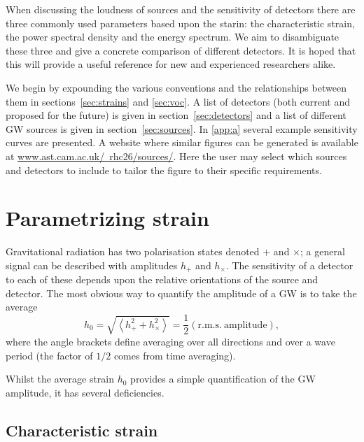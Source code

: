 \documentclass[fleqn,12pt]{iopart}
\begin{document}
When discussing the loudness of sources and the sensitivity of detectors there are three commonly used parameters based upon the starin: the characteristic strain, the power spectral density and the energy spectrum. We aim to disambiguate these three and give a concrete comparison of different detectors. It is hoped that this will provide a useful reference for new and experienced researchers alike.

We begin by expounding the various conventions and the relationships between them in sections~\ref{sec:strains} and \ref{sec:voc}. A list of detectors (both current and proposed for the future) is given in section~\ref{sec:detectors} and a list of different GW sources is given in section~\ref{sec:sources}. In \ref{app:a} several example sensitivity curves are presented. A website where similar figures can be generated is available at \href{http://www.ast.cam.ac.uk/~rhc26/sources/}{www.ast.cam.ac.uk/~rhc26/sources/}. Here the user may select which sources and detectors to include to tailor the figure to their specific requirements.

\section{Parametrizing strain}

Gravitational radiation has two polarisation states denoted $+$ and $\times$; a general signal can be described with amplitudes $h_{+}$ and $h_{\times}$. The sensitivity of a detector to each of these depends upon the relative orientations of the source and detector. The most obvious way to quantify the amplitude of a GW is to take the average
\begin{equation}\label{eq:h0}
h_{0} = \sqrt{\left< h_{+}^{2}+h_{\times}^{2} \right>} = \frac{1}{2}\left( \mathrm{r.m.s.\ amplitude} \right),
\end{equation}
where the angle brackets define averaging over all directions and over a wave period (the factor of $1/2$ comes from time averaging).

Whilst the average strain $h_0$ provides a simple quantification of the GW amplitude, it has several deficiencies. 

\subsection{Characteristic strain}
\end{document}
